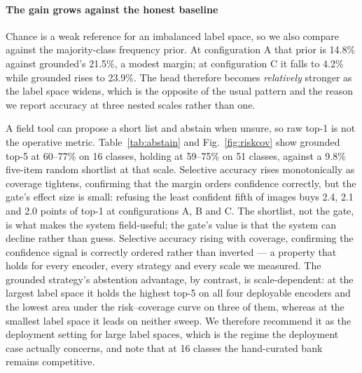 \documentclass[a4paper,fleqn]{cas-dc}
\begin{document}
\paragraph{The gain grows against the honest baseline} Chance is a weak reference for an imbalanced
label space, so we also compare against the majority-class frequency prior. At configuration A that
prior is 14.8\% against grounded's 21.5\%, a modest margin; at configuration C it falls to 4.2\%
while grounded rises to 23.9\%. The head therefore becomes \emph{relatively} stronger as the label
space widens, which is the opposite of the usual pattern and the reason we report accuracy at three
nested scales rather than one.

A field tool can propose a short list and abstain when unsure, so raw top-1 is not the operative
metric. %
Table~\ref{tab:abstain} and Fig.~\ref{fig:riskcov} show grounded top-5 at 60--77\% on 16 classes, holding at 59--75\% on
51 classes, against a 9.8\% five-item random shortlist at that scale. Selective accuracy rises monotonically as coverage tightens, confirming that the
margin orders confidence correctly, but the gate's effect size is small: refusing the least
confident fifth of images buys 2.4, 2.1 and 2.0 points of top-1 at configurations A, B and C.
The shortlist, not the gate, is what makes the system field-useful; the gate's value is that
the system can decline rather than guess. Selective accuracy rising with coverage,
confirming the confidence signal is correctly ordered rather than inverted --- a property that
holds for every encoder, every strategy and every scale we measured. The grounded strategy's
abstention advantage, by contrast, is scale-dependent: at the largest label space it holds the
highest top-5 on all four deployable encoders and the lowest area under the risk--coverage curve
on three of them, whereas at the smallest label space it leads on neither sweep. We therefore recommend
it as the deployment setting for large label spaces, which is the regime the deployment case
actually concerns, and note that at 16 classes the hand-curated bank remains competitive.
\end{document}
